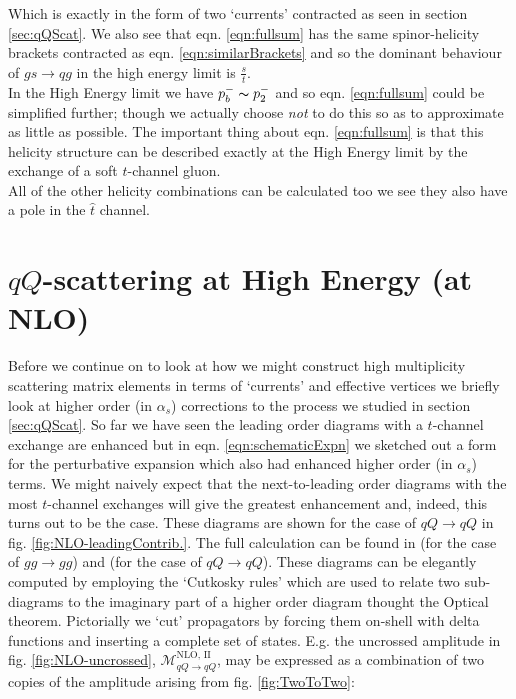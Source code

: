 			Which is exactly in the form of two `currents' contracted as seen in section \ref{sec:qQScat}.  We also
			see that eqn. \eqref{eqn:fullsum} has the same spinor-helicity brackets contracted as eqn. \eqref{eqn:similarBrackets}
			and so the dominant behaviour of $gs\rightarrow qg$ in the high energy limit is $\frac{s}{t}$.\\In the High Energy
			limit we have $p_b^-\thicksim p_2^-$ and so eqn. \eqref{eqn:fullsum} could be simplified further; though we
			actually choose \emph{not} to do this so as to approximate as little as possible.  The important thing about eqn.
			\eqref{eqn:fullsum} is that this helicity structure can be described exactly at the High Energy limit by the
			exchange of a soft $t$-channel gluon.\\  All of the other helicity combinations can be calculated too we see
			they also have a pole in the $\hat t$ channel.

	\section{$qQ$-scattering at High Energy (at NLO)}
		\label{sub:HE22_NLO}

		Before we continue on to look at how we might construct high multiplicity scattering matrix
		elements in terms of `currents' and effective vertices we briefly look at higher order (in
		$\alpha_s$) corrections to the process we studied in section \ref{sec:qQScat}.
		So far we have seen the leading order diagrams with a $t$-channel exchange are enhanced but in
		eqn. \eqref{eqn:schematicExpn} we sketched out a form for the perturbative expansion which also
		had enhanced higher order (in $\alpha_s$) terms.  We might naively expect that the next-to-leading
		order diagrams with the most $t$-channel exchanges will give the greatest enhancement and, indeed,
		this turns out to be the case.  These diagrams are shown for the case of $qQ\rightarrow qQ$ in fig.
		\eqref{fig:NLO-leadingContrib.}. The full calculation can be found in \cite{DelDuca:1995hf} (for
		the case of $gg\rightarrow gg$) and \cite{sabioThesis} (for the case of $qQ\rightarrow qQ$).  These
		diagrams can be elegantly computed by employing the `Cutkosky rules' which are used to relate two
		sub-diagrams to the imaginary part of a higher order diagram thought the Optical theorem.  Pictorially
		we `cut' propagators by forcing them on-shell with delta functions and inserting a complete set of
		states.  E.g. the uncrossed amplitude in fig. \eqref{fig:NLO-uncrossed},
		$\mathcal{M}_{qQ\rightarrow qQ}^{\text{NLO, II}}$, may be expressed as a combination of two copies
		of the amplitude arising from fig. \eqref{fig:TwoToTwo}:

